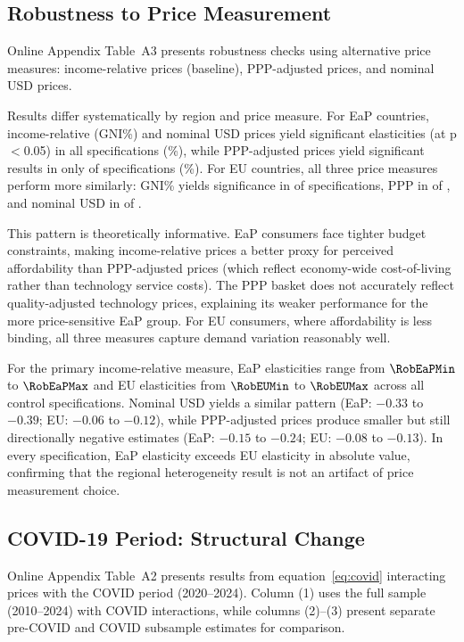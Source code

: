 \subsection{Robustness to Price Measurement}

Online Appendix Table~A3 presents robustness checks using alternative price measures: income-relative prices (baseline), PPP-adjusted prices, and nominal USD prices. 

Results differ systematically by region and price measure. For EaP countries, income-relative (GNI\%) and nominal USD prices yield significant elasticities (at p$<$0.05) in all \NPerMeasure{} specifications (\PctGNISigEaP\%), while PPP-adjusted prices yield significant results in only \CntPPPSigEaP{} of \NPerMeasure{} specifications (\PctPPPSigEaP\%). For EU countries, all three price measures perform more similarly: GNI\% yields significance in \CntGNISigEU{} of \NPerMeasure{} specifications, PPP in \CntPPPSigEU{} of \NPerMeasure{}, and nominal USD in \CntUSDSigEU{} of \NPerMeasure{}.

This pattern is theoretically informative. EaP consumers face tighter budget constraints, making income-relative prices a better proxy for perceived affordability than PPP-adjusted prices (which reflect economy-wide cost-of-living rather than technology service costs). The PPP basket does not accurately reflect quality-adjusted technology prices, explaining its weaker performance for the more price-sensitive EaP group. For EU consumers, where affordability is less binding, all three measures capture demand variation reasonably well.

For the primary income-relative measure, EaP elasticities range from $\RobEaPMin$ to $\RobEaPMax$ and EU elasticities from $\RobEUMin$ to $\RobEUMax$ across all \NPerMeasure{} control specifications. Nominal USD yields a similar pattern (EaP: $-0.33$ to $-0.39$; EU: $-0.06$ to $-0.12$), while PPP-adjusted prices produce smaller but still directionally negative estimates (EaP: $-0.15$ to $-0.24$; EU: $-0.08$ to $-0.13$). In every specification, EaP elasticity exceeds EU elasticity in absolute value, confirming that the regional heterogeneity result is not an artifact of price measurement choice.

\subsection{COVID-19 Period: Structural Change}

Online Appendix Table~A2 presents results from equation~\eqref{eq:covid} interacting prices with the COVID period (2020--2024). Column (1) uses the full sample (2010--2024) with COVID interactions, while columns (2)--(3) present separate pre-COVID and COVID subsample estimates for comparison.

